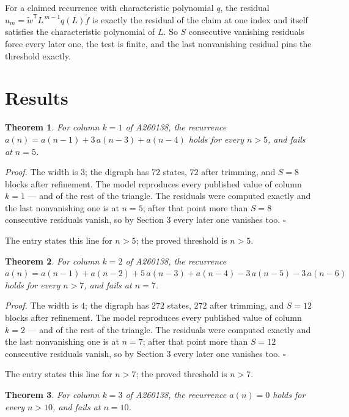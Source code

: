 \documentclass[11pt]{article}
\newtheorem{theorem}{Theorem}
\theoremstyle{definition}
\begin{document}
For a claimed recurrence with characteristic polynomial $q$, the residual $u_m = \tilde w^{\mathsf T}L^{\,m-1}q(L)\tilde f$ is exactly the residual of the claim at one index and itself satisfies the characteristic polynomial of $L$. So $S$ consecutive vanishing residuals force every later one, the test is finite, and the last nonvanishing residual pins the threshold exactly.

\section{Results}

\begin{theorem} For column $k = 1$ of A260138, the recurrence $a(n) = a(n-1) + 3\,a(n-3) + a(n-4)$ holds for every $n > 5$, and fails at $n = 5$.\end{theorem}

{\itshape Proof.} The width is $3$; the digraph has $72$ states, $72$ after trimming, and $S = 8$ blocks after refinement. The model reproduces every published value of column $k = 1$ --- and of the rest of the triangle. The residuals were computed exactly and the last nonvanishing one is at $n = 5$; after that point more than $S = 8$ consecutive residuals vanish, so by Section 3 every later one vanishes too. $\square$

The entry states this line for $n > 5$; the proved threshold is $n > 5$.

\begin{theorem} For column $k = 2$ of A260138, the recurrence $a(n) = a(n-1) + a(n-2) + 5\,a(n-3) + a(n-4) - 3\,a(n-5) - 3\,a(n-6)$ holds for every $n > 7$, and fails at $n = 7$.\end{theorem}

{\itshape Proof.} The width is $4$; the digraph has $272$ states, $272$ after trimming, and $S = 12$ blocks after refinement. The model reproduces every published value of column $k = 2$ --- and of the rest of the triangle. The residuals were computed exactly and the last nonvanishing one is at $n = 7$; after that point more than $S = 12$ consecutive residuals vanish, so by Section 3 every later one vanishes too. $\square$

The entry states this line for $n > 7$; the proved threshold is $n > 7$.

\begin{theorem} For column $k = 3$ of A260138, the recurrence $a(n) = 0$ holds for every $n > 10$, and fails at $n = 10$.\end{theorem}
\end{document}
